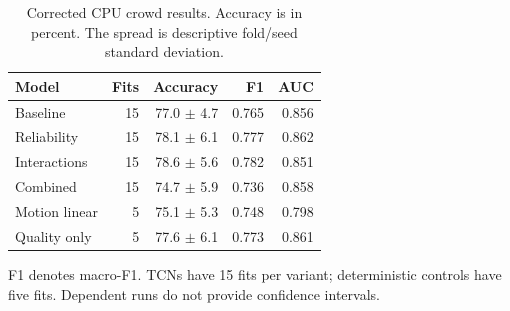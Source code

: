 \begin{table}[t]
\caption{Corrected CPU crowd results. Accuracy is in percent. The spread is descriptive fold/seed standard deviation.}
\label{tab:pose}\centering
\begin{tabular}{lrrrr}
\toprule
Model & Fits & Accuracy & F1 & AUC\\
\midrule
Baseline & 15 & 77.0 $\pm$ 4.7 & 0.765 & 0.856\\
Reliability & 15 & 78.1 $\pm$ 6.1 & 0.777 & 0.862\\
Interactions & 15 & 78.6 $\pm$ 5.6 & 0.782 & 0.851\\
Combined & 15 & 74.7 $\pm$ 5.9 & 0.736 & 0.858\\
Motion linear & 5 & 75.1 $\pm$ 5.3 & 0.748 & 0.798\\
Quality only & 5 & 77.6 $\pm$ 6.1 & 0.773 & 0.861\\
\bottomrule
\end{tabular}
\par\smallskip\parbox{\columnwidth}{\footnotesize F1 denotes macro-F1. TCNs have 15 fits per variant; deterministic controls have five fits. Dependent runs do not provide confidence intervals.}
\end{table}
